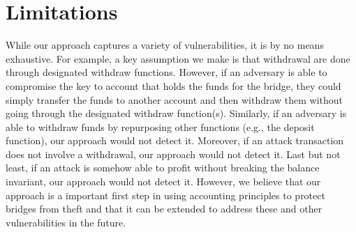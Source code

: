 \section{Limitations}
While our approach captures a variety of vulnerabilities, it is by no means exhaustive. For example, a key assumption we make is that withdrawal are done through designated withdraw functions. However, if an adversary is able to compromise the key to account that holds the funds for the bridge, they could simply transfer the funds to another account and then withdraw them without going through the designated withdraw function(s). Similarly, if an adversary is able to withdraw funds by repurposing other functions (e.g., the deposit function), our approach would not detect it. Moreover, if an attack transaction does not involve a withdrawal, our approach would not detect it. Last but not least, if an attack is somehow able to profit without breaking the balance invariant, our approach would not detect it.  However, we believe that our approach is a important first step in using accounting principles to protect bridges from theft and that it can be extended to address these and other vulnerabilities in the future.